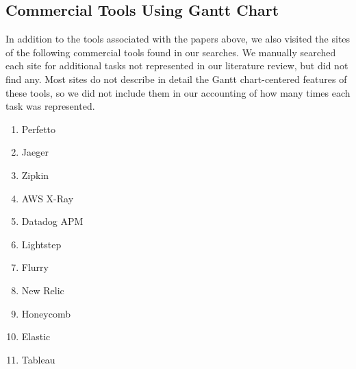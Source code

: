 \begin{refsection}
\section{Commercial Tools Using Gantt Chart}
\label{sec:ctools}
In addition to the tools associated with the papers above, we also visited the sites of the following commercial tools found in our searches. We manually searched each site for additional tasks not represented in our literature review, but did not find any. Most sites do not describe in detail the Gantt chart-centered features of these tools, so we did not include them in our accounting of how many times each task was represented.


\begin{enumerate}
    \item Perfetto \cite{Perfetto}
    \item Jaeger \cite{Jaeger}
    \item Zipkin \cite{Zipkin}
    \item AWS X-Ray \cite{AmazonXRay}
    \item Datadog APM \cite{Datadog}
    \item Lightstep \cite{Lightstep}
    \item Flurry \cite{Flurry}
    \item New Relic \cite{NewRelic}
    \item Honeycomb \cite{Honeycomb}
    \item Elastic \cite{Elastic}
    \item Tableau \cite{Tableau}
\end{enumerate}

\printbibliography[heading=subbibnumbered]
\end{refsection}